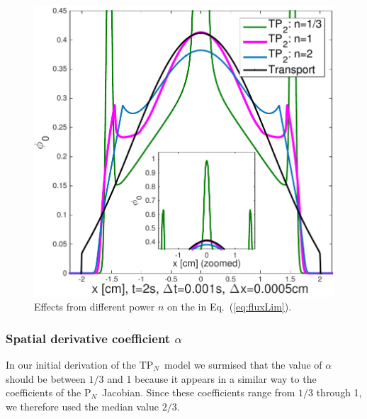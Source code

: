 \documentclass[review]{elsarticle}
\newcommand{\pn}{P$_N$}
\newcommand{\dn}{D$_N$}
\begin{document}
\begin{figure}[ht!]
\centering
\includegraphics[width=.5\linewidth]{fl3_n_comp2.pdf}
\caption{Effects from different power $n$ on the in Eq.~(\ref{eq:fluxLim}).}
\label{f:tp3n}
\end{figure}
\subsubsection{Spatial derivative coefficient $\alpha$}
In our initial derivation of the T\pn~model we surmised that the value of $\alpha$ should be between $1/3$ and 1 because it appears in a similar way to the coefficients of the \pn~Jacobian. Since these coefficients range from $1/3$ through 1, we therefore used the median value $2/3$. %

\end{document}

